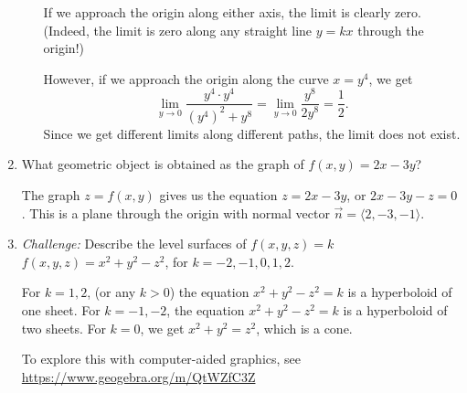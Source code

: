 \documentclass[12pt]{article}
\begin{document}
\begin{enumerate}
\begin{enumerate}
If we approach the origin along either axis, the limit is clearly zero. (Indeed, the limit is zero along any straight line $y=kx$ through the origin!)

However, if we approach the origin along the curve $x=y^4$, we get
\[
\lim_{y\to 0}\frac{y^4\cdot y^4}{(y^4)^2+y^8}=\lim_{y\to 0}\frac{y^8}{2y^8} = \frac12.
\]
Since we get different limits along different paths, the limit does not exist.

\end{enumerate}

\item What geometric object is obtained as the graph of $f(x,y)=2x-3y$?

The graph $z=f(x,y)$ gives us the equation $z=2x-3y$, or $2x-3y-z=0$. This is a plane through the origin with normal vector $\vec{n}=\langle 2,-3,-1\rangle$.

\item \textit{Challenge:} Describe the level surfaces of $f(x,y,z)=k$ $f(x,y,z)=x^2+y^2-z^2$, for $k=-2,-1,0,1,2$.

For $k=1, 2$, (or any $k>0$) the equation $x^2+y^2-z^2=k$ is a hyperboloid of one sheet. For $k=-1,-2$, the equation $x^2+y^2-z^2=k$ is a hyperboloid of two sheets. For $k=0$, we get $x^2+y^2=z^2$, which is a cone.

To explore this with computer-aided graphics, see \href{https://www.geogebra.org/m/QtWZfC3Z}{https://www.geogebra.org/m/QtWZfC3Z}
\end{enumerate}

\newpage
\end{document}
